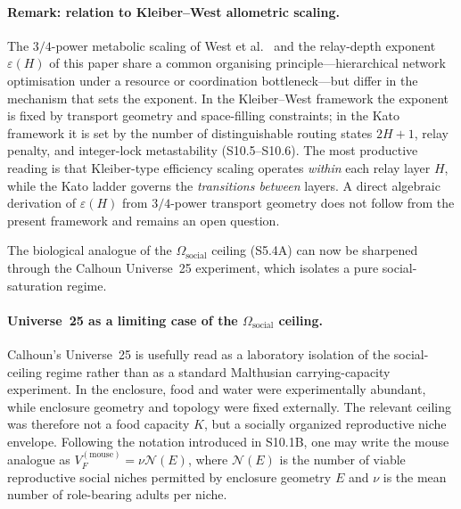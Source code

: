 \documentclass[11pt]{article}
\begin{document}
\paragraph{Remark: relation to Kleiber--West allometric scaling.}
The $3/4$-power metabolic scaling of West et
al.~\cite{west1997} and the relay-depth exponent $\varepsilon(H)$ of
this paper share a common organising principle---hierarchical network
optimisation under a resource or coordination bottleneck---but differ in
the mechanism that sets the exponent.  In the Kleiber--West framework the
exponent is fixed by transport geometry and space-filling constraints; in
the Kato framework it is set by the number of distinguishable routing
states $2H+1$, relay penalty, and integer-lock metastability
(S10.5--S10.6).  The most productive reading is that Kleiber-type
efficiency scaling operates \emph{within} each relay layer $H$, while
the Kato ladder governs the \emph{transitions between} layers.
A direct algebraic derivation of $\varepsilon(H)$ from $3/4$-power
transport geometry does not follow from the present framework and remains
an open question.

\noindent
The biological analogue of the $\Omega_{\mathrm{social}}$ ceiling
(S5.4A) can now be sharpened through the Calhoun Universe~25 experiment,
which isolates a pure social-saturation regime.


\paragraph{Universe~25 as a limiting case of the $\Omega_{\mathrm{social}}$ ceiling.}
Calhoun's Universe~25 is usefully read as a laboratory isolation of the
social-ceiling regime rather than as a standard Malthusian
carrying-capacity experiment.  In the enclosure, food and water were
experimentally abundant, while enclosure geometry and topology were fixed
externally.  The relevant ceiling was therefore not a food capacity $K$,
but a socially organized reproductive niche envelope.  Following the
notation introduced in S10.1B, one may write the mouse analogue as
$V_F^{(\mathrm{mouse})}=\nu\mathcal{N}(E)$,
where $\mathcal{N}(E)$ is the number of viable reproductive social
niches permitted by enclosure geometry $E$ and $\nu$ is the mean number
of role-bearing adults per niche.
\end{document}
